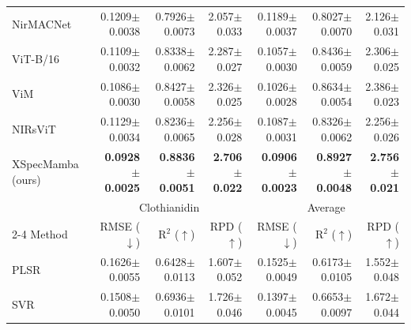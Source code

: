 \documentclass[pdflatex,sn-mathphys-num]{sn-jnl}%
\begin{document}
\begin{table}
\begin{tabular*}{\textheight}{@{\extracolsep\fill}lrrrrrr}
NirMACNet \cite{phuong2025nirmacnet} &
0.1209{\scriptsize$\pm$0.0038} & 0.7926{\scriptsize$\pm$0.0073} & 2.057{\scriptsize$\pm$0.033} &
0.1189{\scriptsize$\pm$0.0037} & 0.8027{\scriptsize$\pm$0.0070} & 2.126{\scriptsize$\pm$0.031} \\

ViT-B/16 \cite{dosovitskiy2021image} &
0.1109{\scriptsize$\pm$0.0032} & 0.8338{\scriptsize$\pm$0.0062} & 2.287{\scriptsize$\pm$0.027} &
0.1057{\scriptsize$\pm$0.0030} & 0.8436{\scriptsize$\pm$0.0059} & 2.306{\scriptsize$\pm$0.025} \\

ViM \cite{zhu2024vision} &
0.1086{\scriptsize$\pm$0.0030} & 0.8427{\scriptsize$\pm$0.0058} & 2.326{\scriptsize$\pm$0.025} &
0.1026{\scriptsize$\pm$0.0028} & 0.8634{\scriptsize$\pm$0.0054} & 2.386{\scriptsize$\pm$0.023} \\

NIRsViT \cite{van2024nirsvit} &
0.1129{\scriptsize$\pm$0.0034} & 0.8236{\scriptsize$\pm$0.0065} & 2.256{\scriptsize$\pm$0.028} &
0.1087{\scriptsize$\pm$0.0031} & 0.8326{\scriptsize$\pm$0.0062} & 2.256{\scriptsize$\pm$0.026} \\

\midrule

XSpecMamba (ours) &
\textbf{0.0928{\scriptsize$\pm$0.0025}} &
\textbf{0.8836{\scriptsize$\pm$0.0051}} &
\textbf{2.706{\scriptsize$\pm$0.022}} &
\textbf{0.0906{\scriptsize$\pm$0.0023}} &
\textbf{0.8927{\scriptsize$\pm$0.0048}} &
\textbf{2.756{\scriptsize$\pm$0.021}} \\

\midrule

& \multicolumn{3}{c}{Clothianidin} & \multicolumn{3}{c}{Average} \\
\cmidrule{2-4}\cmidrule{5-7}
Method &
RMSE ($\downarrow$) & $\text{R}^2$ ($\uparrow$) & RPD ($\uparrow$) &
RMSE ($\downarrow$) & $\text{R}^2$ ($\uparrow$) & RPD ($\uparrow$) \\
\midrule

PLSR &
0.1626{\scriptsize$\pm$0.0055} & 0.6428{\scriptsize$\pm$0.0113} & 1.607{\scriptsize$\pm$0.052} &
0.1525{\scriptsize$\pm$0.0049} & 0.6173{\scriptsize$\pm$0.0105} & 1.552{\scriptsize$\pm$0.048} \\

SVR &
0.1508{\scriptsize$\pm$0.0050} & 0.6936{\scriptsize$\pm$0.0101} & 1.726{\scriptsize$\pm$0.046} &
0.1397{\scriptsize$\pm$0.0045} & 0.6653{\scriptsize$\pm$0.0097} & 1.672{\scriptsize$\pm$0.044} \\


\end{tabular*}
\end{table}
\end{document}
